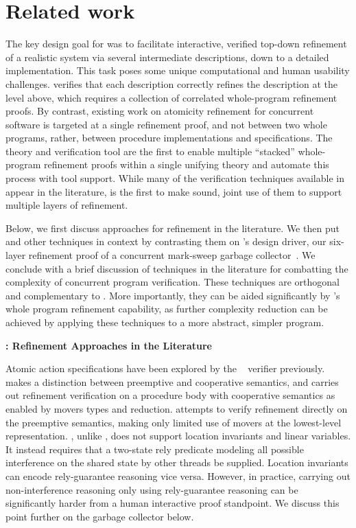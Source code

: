 
\section{Related work}
\label{sec:related}

The key design goal for \civl was to facilitate interactive, verified top-down refinement
of a realistic system via several intermediate
descriptions, down to a detailed implementation.  
This task poses some unique computational and human usability challenges. 
\civl verifies that each description correctly refines the description
at the level above, which requires a collection of correlated
whole-program refinement proofs. 
By contrast, existing work on atomicity refinement for concurrent software is
targeted at a single refinement proof, and not between two whole
programs, rather, between procedure implementations and
specifications. 
The \civl theory and verification tool are the first to
enable multiple ``stacked'' whole-program refinement proofs
within a single unifying theory and automate this process with tool support.
While many of the verification techniques available in \civl appear in
the literature, \civl is the first to make sound, joint use of them to
support multiple layers of refinement. 

Below, we first discuss approaches for refinement in the literature. 
We then put \civl and other techniques in context by contrasting them
on \civl's design driver, our six-layer refinement proof of a
concurrent mark-sweep garbage collector~\cite{gc-techreport}.
We conclude with a brief discussion of techniques in the literature
for combatting the complexity of concurrent program verification. 
These techniques are orthogonal and complementary to \civl.
More importantly, they can be aided significantly by \civl's whole program
refinement capability, as further complexity reduction can be achieved
by applying these techniques to a more abstract, simpler program. 

{\bf: Refinement Approaches in the Literature}

Atomic action specifications have been explored by the
\calvin~\cite{FlanaganFQS05,FreundQ04} verifier previously. 
\civl makes a distinction between preemptive and cooperative
semantics, and carries out refinement verification on a procedure body
with cooperative semantics as enabled by movers types and reduction.
\calvin attempts to verify refinement directly on the preemptive
semantics, making only limited use of movers at the lowest-level
representation. 
\calvin, unlike \civl, does not support location invariants and linear
variables. 
It instead requires that a two-state rely predicate modeling all possible
interference on the shared state by other threads be supplied. 
Location invariants can encode rely-guarantee reasoning vice versa. 
However, in practice, carrying out non-interference reasoning only
using rely-guarantee reasoning can be significantly harder from a
human interactive proof standpoint. We discuss this point further on
the garbage collector below. 

